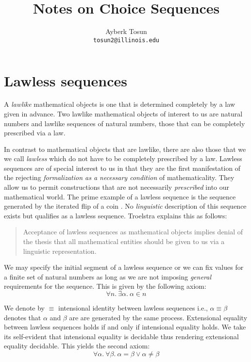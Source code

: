 \documentclass[11pt]{article}
\author{Ayberk Tosun\\\texttt{tosun2@illinois.edu}}
\title{Notes on Choice Sequences}
\begin{document}
\maketitle
\section{Lawless sequences}

A \emph{lawlike} mathematical objects is one that is determined completely by
a law given in advance. Two lawlike mathematical objects of interest to us are
natural numbers and lawlike sequences of natural numbers, those that can be
completely prescribed via a law.

In contrast to mathematical objects that are lawlike, there are also those that
we we call \emph{lawless} which do not have to be completely prescribed by a
law. Lawless sequences are of special interest to us in that they are the first
manifestation of the rejecting \emph{formalization as a necessary condition} of
mathematicality. They allow us to permit constructions that are not necessarily
\emph{prescribed} into our mathematical world. The prime example of a lawless
sequence is the sequence generated by the iterated flip of a coin
\cite{sep-intuitionism}. No \emph{linguistic} description of this sequence
exists but qualifies as a lawless sequence. Troelstra explains this as follows:
\begin{quote}
  Acceptance of lawless sequences as mathematical objects implies denial of the
  thesis that all mathematical entities should be given to us via a
  linguistic representation. \cite[pg. 11]{troelstra-choice-sequence}
\end{quote}

We may specify the initial segment of a lawless sequence or we can fix values
for a finite set of natural numbers as long as we are not imposing
\emph{general} requirements for the sequence. This is given by the following
axiom:
\begin{equation}
  \forall n.\ \exists \alpha.\ \alpha \in n   \tag{LS1}
\end{equation}

We denote by $\equiv$ intensional identity between lawless sequences i.e.,
$\alpha \equiv \beta$ denotes that $\alpha$ and $\beta$ are are generated by
the same process. Extensional equality between lawless sequences holds if and
only if intensional equality holds. We take its self-evident that intensional
equality is decidable thus rendering extensional equality decidable. This
yields the second axiom:
\begin{equation}
  \forall \alpha.\ \forall \beta.\ \alpha = \beta \lor \alpha \neq \beta
  \tag{LS2}
\end{equation}
\end{document}
